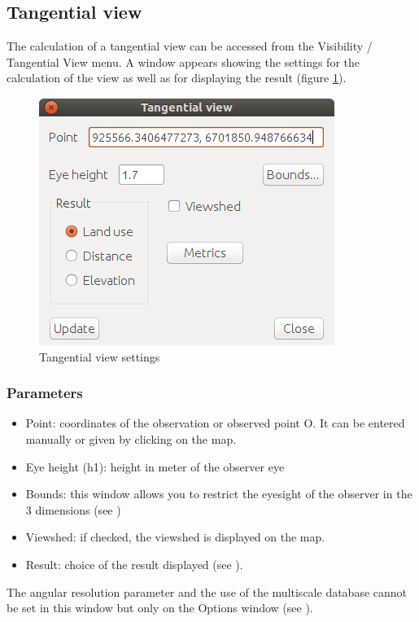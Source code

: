 \documentclass{report}
\begin{document}
\subsection{Tangential view}

The calculation of a tangential view can be accessed from the Visibility / Tangential View menu. A window appears showing the settings for the calculation of the view as well as for displaying the result (figure \ref{viewtan_param}). 

\begin{figure}[H]
	\includegraphics[scale=0.5]{img/viewtan_dlg-en.png} 
	\caption{Tangential view settings}
	\label{viewtan_param}
\end{figure}

\subsubsection{Parameters}

\begin{itemize}
	\item Point: coordinates of the observation or observed point O. It can be entered manually or given by clicking on the map.
	\item Eye height (h1): height in meter of the observer eye
	\item Bounds: this window allows you to restrict the eyesight of the observer in the 3 dimensions (see )
	\item Viewshed: if checked, the viewshed is displayed on the map.
	\item Result: choice of the result displayed (see ).
\end{itemize}

The angular resolution parameter and the use of the multiscale database cannot be set in this window but only on the Options window (see ).
\end{document}
